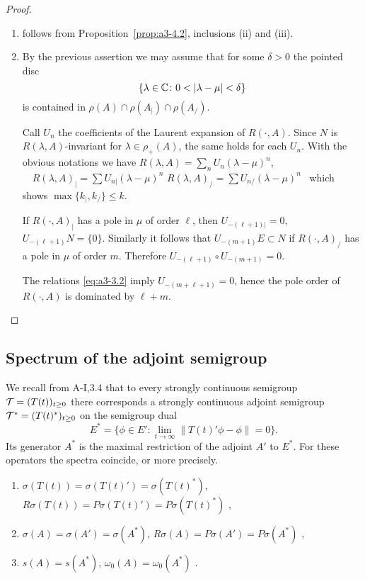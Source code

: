 \begin{proof}
\begin{enumerate}[\upshape (i), wide, labelsep=.5em]
\item 
follows from Proposition~\ref{prop:a3-4.2}, inclusions (ii) and (iii).

\item 
By the previous assertion we may assume that for some $\delta > 0$ the pointed disc
\[
\{\lambda \in \mathbb{C} \colon 0 < |\lambda-\mu| < \delta\}
\]
is contained in $\rho(A) \cap \rho(A_{|}) \cap \rho(A_{/})$.

Call $U_{n}$ the coefficients of the Laurent expansion of $R(\cdot,A)$.
Since $N$ is $R(\lambda,A)$-invariant for $\lambda \in \rho_{+}(A)$, the same holds for each $U_{n}$.
With the obvious notations we have \quad
$R(\lambda,A) = \sum_{n} U_{n}(\lambda-\mu)^{n}$, $\quad R(\lambda,A)_{|} = \sum U_{n|}(\lambda-\mu)^{n}$ \quad {} \quad $R(\lambda,A)_{/} = \sum U_{n/}(\lambda-\mu)^{n}$~
which shows $\max\{k_{|},k_{/}\} \leq k$.

If $R(\cdot,A)_{|}$ has a pole in $\mu$ of order $\ell$, then $U_{-(\ell+1)|} = 0$, \ie $U_{-(\ell+1)}N = \{0\}$.
Similarly it follows that $U_{-(m+1)}E \subset N$ if $R(\cdot,A)_{/}$ has a pole in $\mu$ of order $m$.
Therefore $U_{-(\ell+1)} \circ U_{-(m+1)} = 0$.

The relations \eqref{eq:a3-3.2} imply $U_{-(m+\ell+1)} = 0$, hence the pole order of $R(\cdot,A)$ is dominated by $\ell + m$.
\end{enumerate}
\end{proof}

\subsection{Spectrum of the adjoint semigroup}\label{subsec:a3-4.4}
We recall from A-I,3.4 that to every strongly continuous semigroup $\mathcal{T} = (T(t))_{t \geq 0}$ there corresponds a strongly continuous adjoint semigroup $\mathcal{T}^* = (T(t)^*)_{t \geq 0}$ on the semigroup dual
\[
E^* = \{\phi \in E' \colon \lim_{t \to \infty} \|T(t)'\phi-\phi\| = 0\} .
\]
Its generator $A^*$ is the maximal restriction of the adjoint $A'$ to $E^*$.
For these operators the spectra coincide, or more precisely.
\begin{enumerate}[\upshape (i)]
\item 
$\sigma(T(t)) = \sigma(T(t)') = \sigma(T(t)^*)$,\\
$R\sigma(T(t)) = P\sigma(T(t)') = P\sigma(T(t)^*)$ ,

\item 
$\sigma(A) = \sigma(A') = \sigma(A^*)$, $R\sigma(A) = P\sigma(A') = P\sigma(A^*)$ ,
\item 
$s(A) = s(A^*)$, $\omega_{0}(A) = \omega_{0}(A^*)$ .
\end{enumerate}

